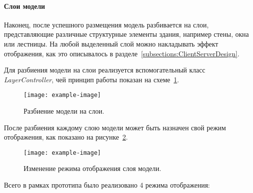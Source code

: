 ﻿\paragraph{Слои модели}

Наконец, после успешного размещения модель разбивается на слои,
представляющие различные структурные элементы здания,
например стены, окна или лестницы. На любой выделенный слой
можно накладывать эффект отображения, как это описывалось
в разделе~\ref{subsections:ClientServerDesign}.

Для разбиения модели на слои реализуется вспомогательный класс
\emph{LayerController}, чей принцип работы показан
на схеме~\ref{figure:SInitLayers}.

\begin{figure}[!htp]
    \centering
    \texttt{[image: example-image]}
    \caption{Разбиение модели на слои.}
    \label{figure:SInitLayers}
\end{figure}

После разбиения каждому слою модели может быть назначен
свой режим отображения, как показано на рисунке~\ref{figure:SLayerSetMode}.

\begin{figure}[!htp]
    \centering
    \texttt{[image: example-image]}
    \caption{Изменение режима отображения слоя модели.}
    \label{figure:SLayerSetMode}
\end{figure}

Всего в рамках прототипа было реализовано 4 режима отображения:

